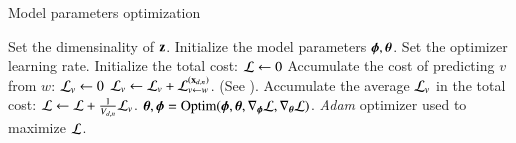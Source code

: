 \begin{algorithm} %
\caption{Model parameters optimization} %
\label{alg:optim} %
\begin{algorithmic} %
	\Require Set the dimensinality of $\mathbf{z}$. Initialize the model parameters $\boldsymbol{\phi}, \boldsymbol{\theta}$. Set the optimizer learning rate.
		\State Initialize the total cost:
		\State $\mathcal{L} \leftarrow 0$
					\State Accumulate the cost of predicting $v$ from $w$:
					\State $\mathcal{L}_v \leftarrow 0$
						\State $\mathcal{L}_v \leftarrow \mathcal{L}_v + \mathcal{L}_{v \leftarrow w}^{(\mathbf{x}_{d,n})}$. (See ).
					\EndFor
					\State Accumulate the average $\mathcal{L}_v$ in the total cost:
					\State $\mathcal{L} \leftarrow \mathcal{L} + \frac{1}{V_{d,n}} \mathcal{L}_v$.
				\EndFor
			\EndFor
		\EndFor
		\State $\boldsymbol{\theta}, \boldsymbol{\phi} = \operatorname{Optim}(\boldsymbol{\phi}, \boldsymbol{\theta}, \nabla_{\boldsymbol{\phi}} \mathcal{L}, \nabla_{\boldsymbol{\theta}} \mathcal{L})$. \textit{Adam} optimizer used to maximize $\mathcal{L}$.
	\EndWhile
\end{algorithmic}
\end{algorithm}
